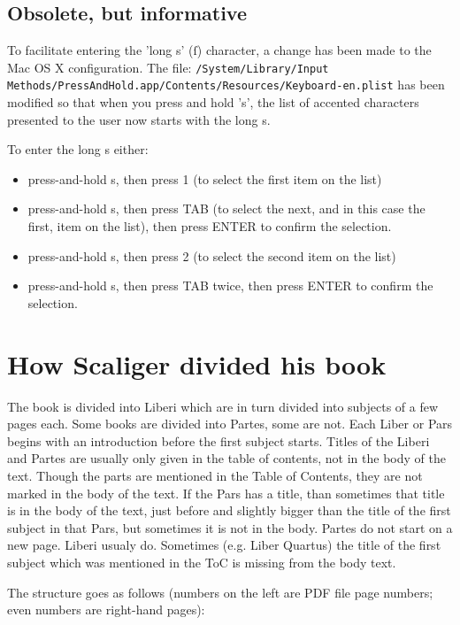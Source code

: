 \documentclass{report}
\begin{document}
\section{Obsolete, but informative}
To facilitate entering the 'long s' (ſ) character, a change has been made to the Mac OS X configuration. The file:
\texttt{/System/Library/Input Methods/PressAndHold.app/Contents/Resources/Keyboard-en.plist}
has been modified so that when you press and hold 's', the list of accented characters presented to the user now starts with the long s.

To enter the long s either:
\begin{itemize}
\item press-and-hold s, then press 1 (to select the first item on the list)
\item press-and-hold s, then press TAB (to select the next, and in this case the first, item on the list), then press ENTER to confirm the selection.
\end{itemize}

\begin{itemize}
\item press-and-hold s, then press 2 (to select the second item on the list)
\item press-and-hold s, then press TAB twice, then press ENTER to confirm the selection.
\end{itemize}

\chapter{How Scaliger divided his book}
The book is divided into Liberi which are in turn divided into subjects of a few pages each. Some books are divided into Partes, some are not. Each Liber or Pars begins with an introduction before the first subject starts. Titles of the Liberi and Partes are usually only given in the table of contents, not in the body of the text. Though the parts are mentioned in the Table of Contents, they are not marked in the body of the text. If the Pars has a title, than sometimes that title is in the body of the text, just before and slightly bigger than the title of the first subject in that Pars, but sometimes it is not in the body. Partes do not start on a new page. Liberi usualy do. Sometimes (e.g. Liber Quartus) the title of the first subject which was mentioned in the ToC is missing from the body text.

The structure goes as follows (numbers on the left are PDF file page numbers; even numbers are right-hand pages):
\end{document}
